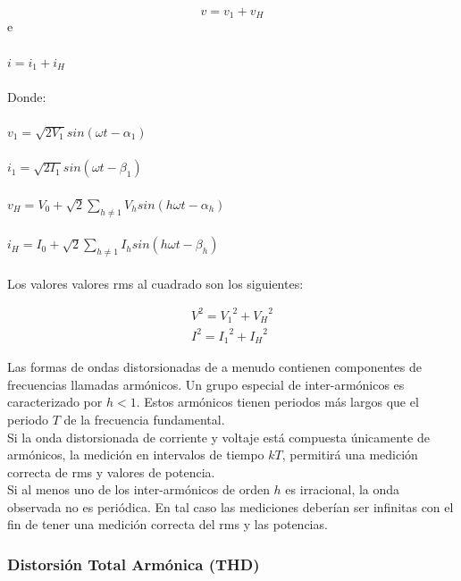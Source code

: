 \begin{equation}\label{EQ22}
v=v_{1}+v_{H} 
\end{equation}
e\\\\
$i=i_{1}+i_{H}$\\\\
Donde:\\\\
$v_{1}=\sqrt{2V_{1}}sin(\omega t - \alpha_{1})$\\\\
$i_{1}=\sqrt{2I_{1}}sin(\omega t - \beta_{1})$\\\\
$v_{H}=V_{0}+\sqrt{2}\sum_{h\neq 1}^{}V_{h}sin(h\omega t-\alpha_{h})$\\\\
$i_{H}=I_{0}+\sqrt{2}\sum_{h\neq 1}^{}I_{h}sin(h\omega t-\beta_{h})$\\\\

Los valores valores rms al cuadrado son los siguientes:

\begin{equation}\label{EQ59}
\begin{split}
V^2 = {V_{1}}^2 + {V_{H}}^2 \\
I^2 = {I_{1}}^2 + {I_{H}}^2
\end{split}
\end{equation}

Las formas de ondas distorsionadas de a menudo contienen componentes de frecuencias llamadas armónicos. Un grupo especial de inter-armónicos es caracterizado por $h<1$. Estos armónicos tienen periodos más largos que el periodo $T$ de la frecuencia fundamental.\cite{A30}\\

Si la onda distorsionada de corriente y voltaje está compuesta únicamente de armónicos, la medición en intervalos de tiempo $kT$, permitirá una medición correcta de rms y valores de potencia. \cite{A30}\\

Si al menos uno de los inter-armónicos de orden $h$ es irracional, la onda observada no es periódica. En tal caso las mediciones deberían ser infinitas con el fin de tener una medición correcta del rms y las potencias.\cite{A30}\\

\subsubsection{Distorsión Total Armónica (THD) } 

